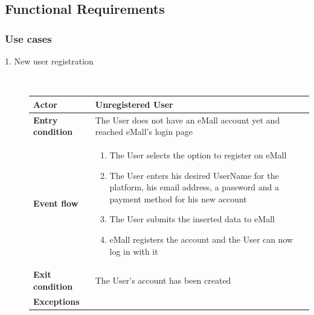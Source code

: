 \documentclass[11pt]{article}
\begin{document}
\newpage

\subsection{Functional Requirements}

\subsubsection{Use cases}

\begin{description}
    \item [1. New user registration] \hfill \\
    \begin{table}[H]
        \centering
        \setlength{\tabcolsep}{18pt}
        \renewcommand{\arraystretch}{1.4}
        \begin{tabularx}{\textwidth}{|>{\hsize=0.5\hsize}X|>{\hsize=1.5\hsize}X|}
            \hline
            \textbf{Actor} & Unregistered User \\
            \hline
            \textbf{Entry condition} & The User does not have an eMall account yet and reached eMall's login page \\
            \hline
            \textbf{Event flow} & 
                \begin{minipage}[t]{\hsize}
                \begin{enumerate}[topsep=0pt, leftmargin=*]
                    \item The User selects the option to register on eMall
                    \item The User enters his desired UserName for the platform, his email address, a password and a payment method for his new account
                    \item The User submits the inserted data to eMall
                    \item eMall registers the account and the User can now log in with it
                \end{enumerate}
                \end{minipage}
                \vspace{6pt}
            \\
            \hline
            \textbf{Exit condition} & The User's account has been created \\
            \hline
            \textbf{Exceptions} & 

\end{tabularx}
\end{table}
\end{description}
\end{document}
